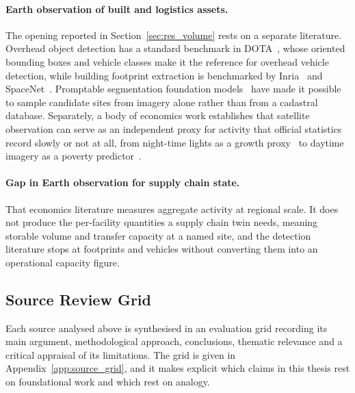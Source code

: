 \paragraph{Earth observation of built and logistics assets.}
The opening reported in Section~\ref{sec:res_volume} rests on a separate literature.
Overhead object detection has a standard benchmark in DOTA~\autocite{xia2018dota}, whose
oriented bounding boxes and vehicle classes make it the reference for overhead vehicle
detection, while
building footprint extraction is benchmarked by
Inria~\autocite{maggiori2017inria} and SpaceNet~\autocite{vanetten2018spacenet}.
Promptable segmentation foundation models~\autocite{kirillov2023segment} have made it
possible to sample candidate sites from imagery alone rather than from a cadastral
database. Separately, a body of economics work establishes that satellite observation can
serve as an independent proxy for activity that official statistics record slowly or not at
all, from night-time lights as a growth proxy~\autocite{henderson2012measuring} to
daytime imagery as a poverty predictor~\autocite{jean2016combining}.

\paragraph{Gap in Earth observation for supply chain state.}
That economics literature measures aggregate activity at regional scale. It does not
produce the per-facility quantities a supply chain twin needs, meaning storable volume and
transfer capacity at a named site, and the detection literature stops at footprints and
vehicles without converting them into an operational capacity figure.

\subsection{Source Review Grid}
\label{sec:lit_grid}

Each source analysed above is synthesised in an evaluation grid recording its main argument,
methodological approach, conclusions, thematic relevance and a critical appraisal of its
limitations. The grid is given in Appendix~\ref{app:source_grid}, and it makes explicit which
claims in this thesis rest on foundational work and which rest on analogy.

